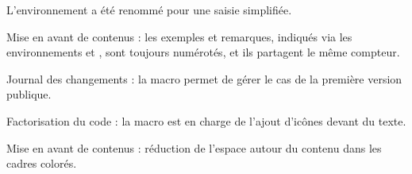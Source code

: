 \documentclass[12pt, a4paper]{article}
\begin{document}
\begin{tdocbreak}
	\item L'environnement  a été renommé  pour une saisie simplifiée.
	
	\item Mise en avant de contenus : les exemples et remarques, indiqués via les environnements  et , sont toujours numérotés, et ils partagent le même compteur.
\end{tdocbreak}


\begin{tdocnew}
    \item Journal des changements : la macro  permet de gérer le cas de la première version publique. 

    \item Factorisation du code : la macro  est en charge de l'ajout d'icônes devant du texte.
\end{tdocnew}


\begin{tdocupdate}
    \item Mise en avant de contenus : réduction de l'espace autour du contenu dans les cadres colorés.
\end{tdocupdate}
\end{document}
